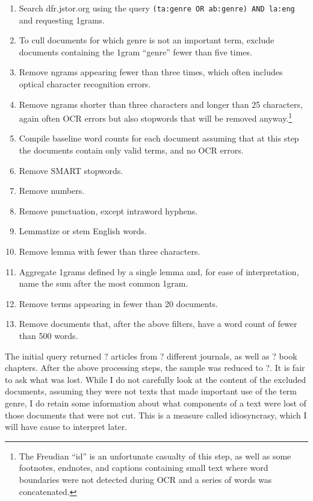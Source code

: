 \documentclass[]{book}
\providecommand{\tightlist}{%
  \setlength{\itemsep}{0pt}\setlength{\parskip}{0pt}}
\let\rmarkdownfootnote\footnote%
\def\footnote{\protect\rmarkdownfootnote}
\theoremstyle{definition}
\theoremstyle{definition}
\theoremstyle{definition}
\theoremstyle{remark}
\begin{document}
\begin{enumerate}
\def\labelenumi{\arabic{enumi}.}
\tightlist
\item
  Search dfr.jstor.org using the query
  \texttt{(ta:genre\ OR\ ab:genre)\ AND\ la:eng} and requesting 1grams.
\item
  To cull documents for which genre is not an important term, exclude
  documents containing the 1gram ``genre'' fewer than five times.
\item
  Remove ngrams appearing fewer than three times, which often includes
  optical character recognition errors.
\item
  Remove ngrams shorter than three characters and longer than 25
  characters, again often OCR errors but also stopwords that will be
  removed anyway.\footnote{The Freudian ``id'' is an unfortunate
    casualty of this step, as well as some footnotes, endnotes, and
    captions containing small text where word boundaries were not
    detected during OCR and a series of words was concatenated.}
\item
  Compile baseline word counts for each document assuming that at this
  step the documents contain only valid terms, and no OCR errors.
\item
  Remove SMART stopwords.
\item
  Remove numbers.
\item
  Remove punctuation, except intraword hyphens.
\item
  Lemmatize or stem English words.
\item
  Remove lemma with fewer than three characters.
\item
  Aggregate 1grams defined by a single lemma and, for ease of
  interpretation, name the sum after the most common 1gram.
\item
  Remove terms appearing in fewer than 20 documents.
\item
  Remove documents that, after the above filters, have a word count of
  fewer than 500 words.
\end{enumerate}

The initial query returned ? articles from ? different journals, as well
as ? book chapters. After the above processing steps, the sample was
reduced to ?. It is fair to ask what was lost. While I do not carefully
look at the content of the excluded documents, assuming they were not
texts that made important use of the term genre, I do retain some
information about what components of a text were lost of those documents
that were not cut. This is a measure called idiosyncrasy, which I will
have cause to interpret later.
\end{document}
